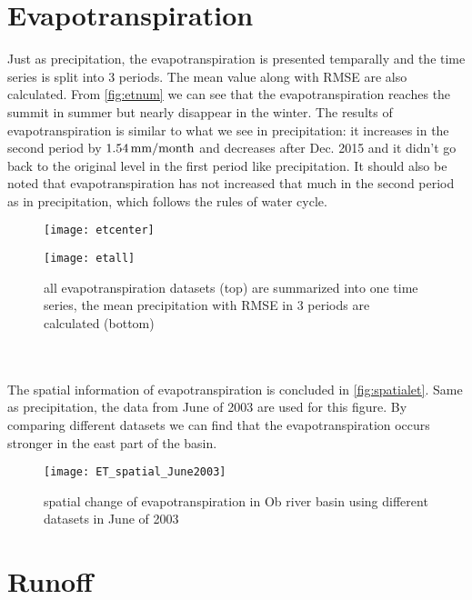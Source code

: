\section{Evapotranspiration}
Just as precipitation, the evapotranspiration is presented temparally and the time series is split into 3 periods. The mean value along with RMSE are also calculated. From \autoref{fig:etnum} we can see that the evapotranspiration reaches the summit in summer but nearly disappear in the winter. The results of evapotranspiration is similar to what we see in precipitation: it increases in the second period by $1.54 \,\mathrm{mm/month}$ and decreases after Dec. 2015 and it didn't go back to the original level in the first period like precipitation. It should also be noted that evapotranspiration has not increased that much in the second period as in precipitation, which follows the rules of water cycle.
\begin{figure}[htbp]\centering
	\begin{minipage}[t]{0.9\textwidth}
		\centering
		\texttt{[image: etcenter]} %
	\end{minipage}
	\begin{minipage}[t]{0.9\textwidth}
		\centering
		\texttt{[image: etall]} %
	\end{minipage}
	\caption{all evapotranspiration datasets (top) are summarized into one time series, the mean precipitation with RMSE in 3 periods are calculated (bottom)}
	\label{fig:etnum}
\end{figure}\\\\
The spatial information of evapotranspiration is concluded in \autoref{fig:spatialet}. Same as precipitation, the data from June of 2003 are used for this figure. By comparing different datasets we can find that the evapotranspiration occurs stronger in the east part of the basin.
\begin{figure}[htbp]\centering
	\centering
	\texttt{[image: ET\_spatial\_June2003]} %
	\caption{spatial change of evapotranspiration in Ob river basin using different datasets in June of 2003} 
	\label{fig:spatialet}
\end{figure}
\clearpage
\section{Runoff}
